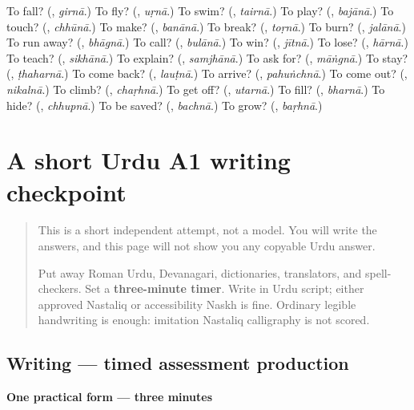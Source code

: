\begin{tcolorbox}[breakable,colback=teal!4,colframe=teal!35!black,title={Before you move on}]
To fall? (\textbf{}, \emph{girnā}.) To fly? (\textbf{}, \emph{uṛnā}.) To swim? (\textbf{}, \emph{tairnā}.) To play? (\textbf{}, \emph{bajānā}.) To touch? (\textbf{}, \emph{chhūnā}.) To make? (\textbf{}, \emph{banānā}.) To break? (\textbf{}, \emph{toṛnā}.) To burn? (\textbf{}, \emph{jalānā}.) To run away? (\textbf{}, \emph{bhāgnā}.) To call? (\textbf{}, \emph{bulānā}.) To win? (\textbf{}, \emph{jītnā}.) To lose? (\textbf{}, \emph{hārnā}.) To teach? (\textbf{}, \emph{sikhānā}.) To explain? (\textbf{}, \emph{samjhānā}.) To ask for? (\textbf{}, \emph{māṅgnā}.) To stay? (\textbf{}, \emph{ṭhaharnā}.) To come back? (\textbf{}, \emph{lauṭnā}.) To arrive? (\textbf{}, \emph{pahuṅchnā}.) To come out? (\textbf{}, \emph{nikalnā}.) To climb? (\textbf{}, \emph{chaṛhnā}.) To get off? (\textbf{}, \emph{utarnā}.) To fill? (\textbf{}, \emph{bharnā}.) To hide? (\textbf{}, \emph{chhupnā}.) To be saved? (\textbf{}, \emph{bachnā}.) To grow? (\textbf{}, \emph{baṛhnā}.)
\end{tcolorbox}
\section[(short timed A1 writing checkpoint)]{A short Urdu A1 writing checkpoint}

\label{lesson:UR-W10-a1-timed-production}



\begin{quote}
This is a short independent attempt, not a model. You will write the answers, and this page will not show you any copyable Urdu answer.

Put away Roman Urdu, Devanagari, dictionaries, translators, and spell-checkers. Set a \textbf{three-minute timer}. Write in Urdu script; either approved Nastaliq or accessibility Naskh is fine. Ordinary legible handwriting is enough: imitation Nastaliq calligraphy is not scored.
\end{quote}

\subsection*{Writing — timed assessment production}
\textbf{One practical form — three minutes}


